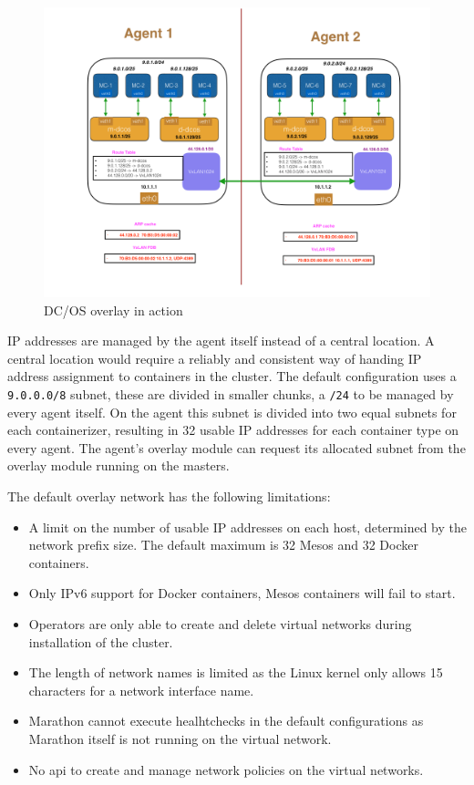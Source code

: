 \begin{figure}
    \centering
    \includegraphics[width=1\columnwidth]{images/dcos-overlay-arch}
    \caption{DC/OS overlay in action\cite{dcos_overlay_arch}}
    \label{fig:dcos-overlay-arch}
\end{figure}

IP addresses are managed by the agent itself instead of a central location. A central location would require a reliably and consistent way of handing IP address assignment to containers in the cluster. The default configuration uses a \texttt{9.0.0.0/8} subnet, these are divided in smaller chunks, a \texttt{/24} to be managed by every agent itself. On the agent this subnet is divided into two equal subnets for each containerizer, resulting in 32 usable IP addresses for each container type on every agent. The agent's overlay module can request its allocated subnet from the overlay module running on the masters.

The default overlay network has the following limitations:
\begin{itemize}
    \item A limit on the number of usable IP addresses on each host, determined by the network prefix size. The default maximum is 32 Mesos and 32 Docker containers.
    \item Only IPv6 support for Docker containers, Mesos containers will fail to start.
    \item Operators are only able to create and delete virtual networks during installation of the cluster.
    \item The length of network names is limited as the Linux kernel only allows 15 characters for a network interface name.
    \item Marathon cannot execute healhtchecks in the default configurations as Marathon itself is not running on the virtual network.
    \item No \gls{api} to create and manage network policies on the virtual networks.
\end{itemize}

